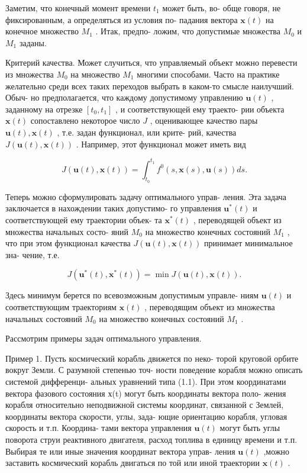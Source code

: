 \documentclass[8pt]{extarticle}
\begin{document}
Заметим, что конечный момент времени \({t}_{1}\) может быть, во- обще говоря, не фиксированным, а определяться из условия по- падания вектора \(\mathbf{x}\left( t\right)\) на конечное множество \({M}_{1}\) . Итак, предпо- ложим, что допустимые множества \({M}_{0}\) и \({M}_{1}\) заданы.

Критерий качества. Может случиться, что управляемый объект можно перевести из множества \({M}_{0}\) на множество \({M}_{1}\) многими способами. Часто на практике желательно среди всех таких переходов выбрать в каком-то смысле наилучший. Обыч- но предполагается, что каждому допустимому управлению \(\mathbf{u}\left( t\right)\) , заданному на отрезке \(\left\lbrack  {{t}_{0},{t}_{1}}\right\rbrack\) , и соответствующей ему траекто- рии объекта \(\mathbf{x}\left( t\right)\) сопоставлено некоторое число \(J\) , оценивающее качество пары \(\mathbf{u}\left( t\right) ,\mathbf{x}\left( t\right)\) , т.е. задан функционал, или крите- рий, качества \(J\left( {\mathbf{u}\left( t\right) ,\mathbf{x}\left( t\right) }\right)\) . Например, этот функционал может иметь вид

\[
J\left( {\mathbf{u}\left( t\right) ,\mathbf{x}\left( t\right) }\right)  = {\int }_{{t}_{0}}^{{t}_{1}}{f}^{0}\left( {s,\mathbf{x}\left( s\right) ,\mathbf{u}\left( s\right) }\right) {ds}. \tag{1.4}
\]

Теперь можно сформулировать задачу оптимального управ- ления. Эта задача заключается в нахождении таких допустимо- го управления \({\mathbf{u}}^{ * }\left( t\right)\) и соответствующей ему траектории объек- та \({\mathbf{x}}^{ * }\left( t\right)\) , переводящей объект из множества начальных состо- яний \({M}_{0}\) на множество конечных состояний \({M}_{1}\) , что при этом функционал качества \(J\left( {\mathbf{u}\left( t\right) ,\mathbf{x}\left( t\right) }\right)\) принимает минимальное зна- чение, т.е.

\[
J\left( {{\mathbf{u}}^{ * }\left( t\right) ,{\mathbf{x}}^{ * }\left( t\right) }\right)  = \min J\left( {\mathbf{u}\left( t\right) ,\mathbf{x}\left( t\right) }\right) .
\]

Здесь минимум берется по всевозможным допустимым управле- ниям \(\mathbf{u}\left( t\right)\) и соответствующим траекториям \(\mathbf{x}\left( t\right)\) , переводящим объект из множества начальных состояний \({M}_{0}\) на множество конечных состояний \({M}_{1}\) .

Рассмотрим примеры задач оптимального управления.

Пример 1. Пусть космический корабль движется по неко- торой круговой орбите вокруг Земли. С разумной степенью точ- ности поведение корабля можно описать системой дифференци- альных уравнений типа (1.1). При этом координатами вектора фазового состояния х(t) могут быть координаты вектора поло- жения корабля относительно неподвижной системы координат, связанной с Землей, координаты вектора скорости, углы, зада- ющие ориентацию корабля, угловая скорость и т.п. Координа- тами вектора управления \(\mathbf{u}\left( t\right)\) могут быть углы поворота струи реактивного двигателя, расход топлива в единицу времени и т.п. Выбирая те или иные значения координат вектора управ- ления \(\mathbf{u}\left( t\right)\) ,можно заставить космический корабль двигаться по той или иной траектории \(\mathbf{x}\left( t\right)\) .
\end{document}
